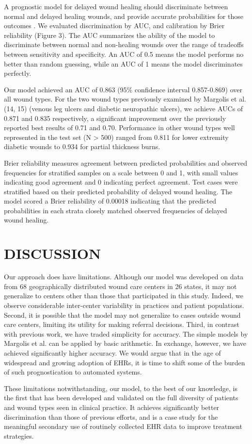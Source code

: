 A prognostic model for delayed wound healing should discriminate
between normal and delayed healing wounds, and provide accurate
probabilities for those outcomes \cite{Cook2007,Cook2008}.  We
evaluated discrimination by AUC, and calibration by Brier reliability
(Figure 3).  The AUC summarizes the ability of the model to
discriminate between normal and non-healing wounds over the range of
tradeoffs between sensitivity and specificity.  An AUC of 0.5 means
the model performs no better than random guessing, while an AUC of 1
means the model discriminates perfectly.

Our model achieved an AUC of 0.863 (95\% confidence interval
0.857-0.869) over all wound types.  For the two wound types previously
examined by Margolis et al. (14, 15) (venous leg ulcers and diabetic
neuropathic ulcers), we achieve AUCs of 0.871 and 0.835 respectively,
a significant improvement over the previously reported best results of
0.71 and 0.70.  Performance in other wound types well represented in
the test set (N > 500) ranged from 0.811 for lower extremity diabetic
wounds to 0.934 for partial thickness burns.

Brier reliability measures agreement between predicted probabilities
and observed frequencies for stratified samples on a scale between 0
and 1, with small values indicating good agreement and 0 indicating
perfect agreement.  Test cases were stratified based on their
predicted probability of delayed wound healing.  The model scored a
Brier reliability of 0.00018 indicating that the predicted
probabilities in each strata closely matched observed frequencies of
delayed wound healing.

\section{DISCUSSION}

Our approach does have limitations. Although our model was developed
on data from 68 geographically distributed wound care centers in 26
states, it may not generalize to centers other than those that
participated in this study.  Indeed, we observe considerable
inter-center variability in practices and patient populations.
Second, it is possible that the model may not generalize to cases
outside wound care centers, limiting its utility for making referral
decisions.  Third, in contrast with previous work, we have traded
simplicity for accuracy.  The simple models by Margolis et al. can be
applied by basic arithmetic.  In exchange, however, we have achieved
significantly higher accuracy.  We would argue that in the age of
widespread and growing adoption of EHRs, it is time to shift some of
the burden of such prognostication to automated systems.

These limitations notwithstanding, our model, to the best of our
knowledge, is the first that has been developed and validated on the
full diversity of patients and wound types seen in clinical practice.
It achieves significantly better discrimination than those of previous
efforts, and is a case study for the meaningful secondary use of
routinely collected EHR data to improve treatment strategies.

